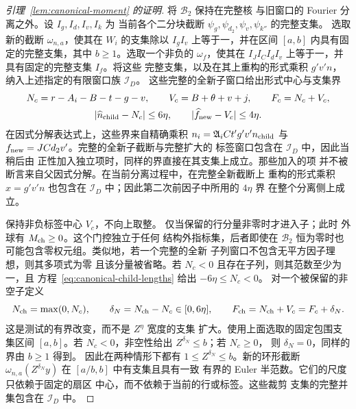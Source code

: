 \documentclass[11pt,a4paper]{article}
\numberwithin{equation}{section}
\numberwithin{figure}{section}
\theoremstyle{definition}
\theoremstyle{remark}
\begin{document}
\begin{proof}[引理~\ref{lem:canonical-moment} 的证明]
将 \(\mathcal B_2\) 保持在完整核
与旧窗口的 Fourier 分离之外。设 \(I_g,I_d,I_v,I_k\) 为
当前各个二分块截断 \(\psi_g,\psi_{d_2},\psi_v,\psi_{k''}\) 的完整支集。
选取新的截断 \(\omega_{n,a}\)，使其在
\(W_i\) 的支集除以 \(I_gI_v\) 上等于一，并在区间
\([a,b]\) 内具有固定的完整支集，其中 \(b\ge1\)。选取一个非负的 \(\omega_f\)，使其在
\(I_JI_CI_dI_v\) 上等于一，并具有固定的完整支集 \(I_f\)。将这些
完整支集，以及在其上重构的形式乘积 \(g'v'n\)，
纳入上述指定的有限窗口族 \(\mathcal I_D\)。
这些完整的全新子窗口给出形式中心与支集界
\begin{equation}\label{eq:canonical-child-lengths}
 \begin{gathered}
 N_c=r-A_i-B-t-g-v,\qquad V_c=B+\theta+v+j,\qquad F_c=N_c+V_c,\\
 |\widehat n_{\rm child}-N_c|\le6\eta,\qquad
 |\widehat f_{\rm new}-V_c|\le4\eta.
 \end{gathered}
\end{equation}
在因式分解表达式上，这些界来自精确乘积
\(n_i=\mathfrak A_iCt'g'v'n_{\rm child}\) 与
\(f_{\rm new}=JCd_2v'\)。完整的全新子截断与完整扩大的
标签窗口包含在 \(\mathcal I_D\) 中，因此当稍后由
正性加入独立项时，同样的界直接在其支集上成立。那些加入的项
并不被断言来自父因式分解。在当前分离过程中，在完整全新截断上
重构的形式乘积 \(x=g'v'n\) 也包含在
\(\mathcal I_D\) 中；因此第二次前因子中所用的 \(4\eta\) 界
在整个分离侧上成立。

保持非负标签中心 \(V_c\)，不向上取整。
仅当保留的行分量非零时才进入子；此时
外球有 \(M_{\rm ch}\ge0\)。这个门控独立于任何
结构外指标集，后者即使在
\(\mathcal B_2\) 恒为零时也可能包含零权元组。类似地，若一个完整的全新
子列窗口不包含无平方因子理想，则其多项式为零
且该分量被省略。若 \(N_c<0\) 且存在子列，则其范数至少为一，且
方程~\eqref{eq:canonical-child-lengths} 给出 \(-6\eta\le N_c<0\)。
对一个被保留的非空子定义
\begin{equation}\label{eq:inverse-child-clipping}
 N_{\rm ch}=\max(0,N_c),\qquad \delta_N=N_{\rm ch}-N_c\in[0,6\eta],
 \qquad F_{\rm ch}=N_{\rm ch}+V_c=F_c+\delta_N.
\end{equation}
这是测试的有界改变，而不是 \(Z^\eta\) 宽度的支集
扩大。使用上面选取的固定包围支集区间 \([a,b]\)。若
\(N_c<0\)，非空性给出 \(Z^{\delta_N}\le b\)；若 \(N_c\ge0\)，
则 \(\delta_N=0\)，同样的界由 \(b\ge1\) 得到。
因此在两种情形下都有 \(1\le Z^{\delta_N}\le b\)。新的环形截断
\(\omega_{n,a}(Z^{\delta_N}y)\) 在 \([a/b,b]\) 中有支集且具有一致
有界的 Euler 半范数。它们的尺度只依赖于固定的扇区
中心，而不依赖于当前的行或标签。这些裁剪
支集的完整并集包含在 \(\mathcal I_D\) 中。


\end{proof}
\end{document}
